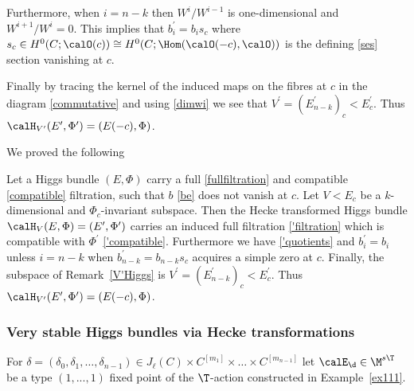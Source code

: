 Furthermore, when $i=n-k$ then $W^{i}/W^{i-1}$ is one-dimensional and $W^{i+1}/W^i=0$. This implies that $b_i^\prime=b_i s_c$ where $s_c\in H^0(C;\calO(c))\cong H^0(C;\Hom(\calO(-c), \calO))$ is the defining \eqref{ses} section vanishing at $c$.

Finally by tracing the kernel of the induced maps on the fibres at $c$ in the diagram \eqref{commutative} and using \eqref{dimwi} we see that $V^\prime=(E^\prime_{n-k})_c<E^\prime_c$. Thus $\calH_{V^\prime}(E^\prime,\Phi^\prime)=(E(-c),\Phi )$.

We proved the following

\begin{proposition}
\notready \label{modifiedfilt}Let a Higgs bundle $(E,\Phi)$ carry a full \eqref{fullfiltration} and compatible \eqref{compatible} filtration, such that $b$ \eqref{be} does not vanish at $c$. Let $V<E_c$ be a  $k$-dimensional and $\Phi_c$-invariant subspace. Then the Hecke transformed Higgs bundle $\calH_V(E,\Phi)=(E^\prime,\Phi^\prime)$ carries an induced full filtration \eqref{'filtration} which is compatible with $\Phi^\prime$ \eqref{'compatible}. Furthermore we have \eqref{'quotients} and $b^\prime_i=b_i$ unless $i=n-k$ when $b^\prime_{n-k}=b_{n-k}s_c$ acquires a simple zero at $c$. Finally, the subspace of Remark~\ref{V'Higgs} is  $V^\prime=(E^\prime_{n-k})_c<E^\prime_c$. Thus $\calH_{V^\prime}(E^\prime,\Phi^\prime)=(E(-c),\Phi )$.
\end{proposition}



\subsubsection{Very stable Higgs bundles via Hecke transformations}



For $\delta=(\delta_0,\delta_1,\dots,\delta_{n-1})\in J_\ell(C)\times C^{[m_1]}\times \dots \times C^{[m_{n-1}]}$ let $\calE_{\d}\in \M^{s\T}$ be a type $(1,...,1)$ fixed point of the $\T$-action constructed in Example~\ref{ex111}.

